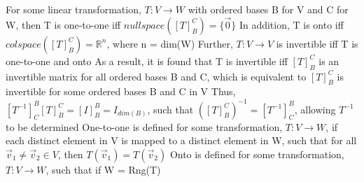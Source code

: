 \documentclass[11 pt, twoside]{article}
\newenvironment{outline*}
{
	\begin{outline}[enumerate]
	}
	{\end{outline}
}
\begin{document}
\begin{outline*}
\1 For some linear transformation, $T: V \to W$ with ordered bases B for V and C for W, then T is one-to-one iff $nullspace([T]^C_B) = \{\vec{0}\}$
\2 In addition, T is onto iff $colspace([T]^C_B) = \mathbb{R}^n$, where n = dim(W)
\2 Further, $T: V \to V$ is invertible iff T is one-to-one and onto
\3 As a result, it is found that T is invertible iff $[T]^C_B$ is an invertible matrix for all ordered bases B and C, which is equivalent to $[T]^C_B$ is invertible for some ordered bases B and C in V
\3 Thus, $[T^{-1}]^B_C[T]^C_B = [I]^B_B = I_{dim(B)}$, such that $([T]^C_B)^{-1} = [T^{-1}]^B_C$, allowing $T^{-1}$ to be determined
\2 One-to-one is defined for some transformation, $T: V \to W$, if each distinct element in V is mapped to a distinct element in W, such that for all $\vec{v}_1 \neq \vec{v}_2 \in V$, then $T(\vec{v}_1) = T(\vec{v}_2)$
\2 Onto is defined for some transformation, $T: V \to W$, such that if W = Rng(T)
\end{outline*}
\end{document}
